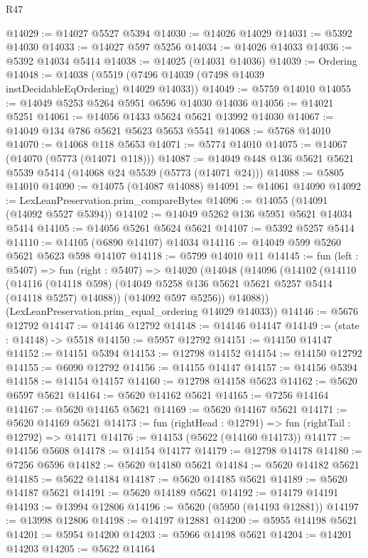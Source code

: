 \begin{lexlean}{R47}
\begin{coremodule}
@14029 := @14027 @5527 @5394
@14030 := @14026 @14029
@14031 := @5392 @14030
@14033 := @14027 @597 @5256
@14034 := @14026 @14033
@14036 := @5392 @14034 @5414
@14038 := @14025 (@14031 @14036)
@14039 := Ordering
@14048 := @14038 (@5519 (@7496 @14039 (@7498 @14039 instDecidableEqOrdering) @14029 @14033))
@14049 := @5759 @14010
@14055 := @14049 @5253 @5264 @5951 @6596 @14030 @14036
@14056 := @14021 @5251
@14061 := @14056 @1433 @5624 @5621 @13992 @14030
@14067 := @14049 @134 @786 @5621 @5623 @5653 @5541
@14068 := @5768 @14010
@14070 := @14068 @118 @5653
@14071 := @5774 @14010
@14075 := @14067 (@14070 (@5773 (@14071 @118)))
@14087 := @14049 @448 @136 @5621 @5621 @5539 @5414 (@14068 @24 @5539 (@5773 (@14071 @24)))
@14088 := @5805 @14010
@14090 := @14075 (@14087 @14088)
@14091 := @14061 @14090
@14092 := LexLeanPreservation.prim_compareBytes
@14096 := @14055 (@14091 (@14092 @5527 @5394))
@14102 := @14049 @5262 @136 @5951 @5621 @14034 @5414
@14105 := @14056 @5261 @5624 @5621
@14107 := @5392 @5257 @5414
@14110 := @14105 (@6890 @14107) @14034
@14116 := @14049 @599 @5260 @5621 @5623 @598 @14107
@14118 := @5799 @14010 @11
@14145 := fun (left : @5407) =>
  fun (right : @5407) =>
  @14020
    (@14048
      (@14096
        (@14102
          (@14110
            (@14116 (@14118 @598) (@14049 @5258 @136 @5621 @5621 @5257 @5414 (@14118 @5257) @14088))
            (@14092 @597 @5256))
          @14088))
      (LexLeanPreservation.prim_equal_ordering @14029 @14033))
@14146 := @5676 @12792
@14147 := @14146 @12792
@14148 := @14146 @14147
@14149 := (state : @14148) -> @5518
@14150 := @5957 @12792
@14151 := @14150 @14147
@14152 := @14151 @5394
@14153 := @12798 @14152
@14154 := @14150 @12792
@14155 := @6090 @12792
@14156 := @14155 @14147
@14157 := @14156 @5394
@14158 := @14154 @14157
@14160 := @12798 @14158 @5623
@14162 := @5620 @6597 @5621
@14164 := @5620 @14162 @5621
@14165 := @7256 @14164
@14167 := @5620 @14165 @5621
@14169 := @5620 @14167 @5621
@14171 := @5620 @14169 @5621
@14173 := fun (rightHead : @12791) => fun (rightTail : @12792) => @14171
@14176 := @14153 (@5622 (@14160 @14173))
@14177 := @14156 @5608
@14178 := @14154 @14177
@14179 := @12798 @14178
@14180 := @7256 @6596
@14182 := @5620 @14180 @5621
@14184 := @5620 @14182 @5621
@14185 := @5622 @14184
@14187 := @5620 @14185 @5621
@14189 := @5620 @14187 @5621
@14191 := @5620 @14189 @5621
@14192 := @14179 @14191
@14193 := @13994 @12806
@14196 := @5620 (@5950 (@14193 @12881))
@14197 := @13998 @12806
@14198 := @14197 @12881
@14200 := @5955 @14198 @5621
@14201 := @5954 @14200
@14203 := @5966 @14198 @5621
@14204 := @14201 @14203
@14205 := @5622 @14164

\end{coremodule}
\end{lexlean}
